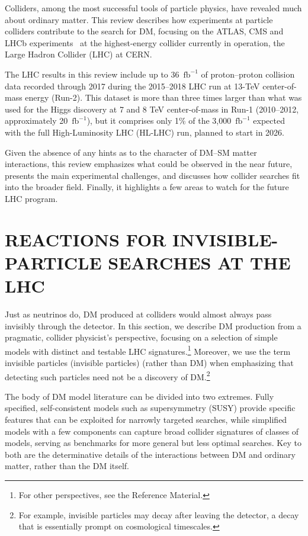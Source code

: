 \documentclass{ar-1col}
\newcommand{\IP}{invisible particle}
\newcommand{\ifb}{\ensuremath{\mathrm{fb}^{-1}}\xspace}
\begin{document}
Colliders, among the most successful tools of particle physics,
have revealed much about ordinary matter. 
This review describes how experiments at particle colliders contribute to the search for DM, focusing on the ATLAS, CMS and LHCb experiments~\cite{ATLAS2008,CMS2008,LHCb2008} at the highest-energy collider currently in operation, the Large Hadron Collider (LHC) at CERN.

The LHC results in this review include up to
36~\ifb of proton--proton collision data recorded through 2017 during 
the 2015--2018 LHC run at 13-TeV center-of-mass energy (Run-2).
This dataset is more than three times larger than what was used for the Higgs discovery
at 7 and 8 TeV center-of-mass in Run-1 (2010--2012, approximately 20~\ifb),
but it comprises only 1\% of the 3,000~\ifb expected with the full High-Luminosity LHC (HL-LHC)
run, planned to start in 2026. 

Given the absence of any hints as to the character of DM--SM
matter interactions, this review emphasizes what could be observed in the near
future, presents the main experimental challenges, and discusses how
collider searches fit into the broader field. Finally, it
highlights a few areas to watch for the future LHC program.

\section{REACTIONS FOR INVISIBLE-PARTICLE SEARCHES AT THE LHC}\label{sec:02_Reactions}

Just as neutrinos do, 
DM produced at colliders would almost always pass invisibly through the detector. 
In this section, we describe DM
production from a pragmatic, collider physicist's perspective,
focusing on a selection of simple models with distinct and
testable LHC signatures.\footnote{For other perspectives, see the
Reference Material.} Moreover, we use the term {invisible
particles ({\IP}s)} (rather than DM) when emphasizing that detecting such
particles need not be a discovery of DM.\footnote{For example,
{\IP}s may decay after leaving the detector, a decay that is
essentially prompt on cosmological timescales.}

The body of DM model literature can be divided into two extremes.
Fully specified, self-consistent models such as supersymmetry (SUSY) provide
specific features that can be exploited for narrowly targeted
searches, while simplified models with a few components can
capture broad collider signatures of classes of models, serving as
benchmarks for more general but less optimal searches. Key to both
are the determinative details of the interactions between DM
and ordinary matter, rather than the DM itself.
\end{document}
